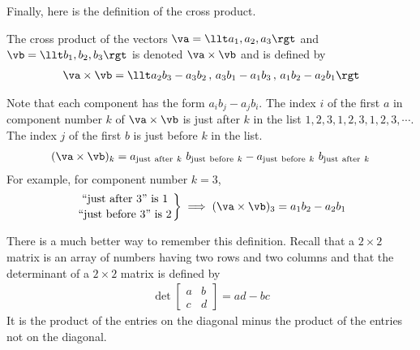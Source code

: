 \noindent
Finally, here is the definition of the cross product.

\begin{defn}\label{def:crossProd}
The cross product of the vectors $\va=\llt a_1,a_2,a_3\rgt$ and 
$\vb=\llt b_1,b_2,b_3\rgt$ is denoted $\va\times\vb$ 
and is defined by
\begin{align*}
\va\times\vb = \llt a_2b_3-a_3b_2\,,\, a_3b_1-a_1b_3\,,\, a_1b_2-a_2b_1\rgt 
\end{align*}
\end{defn}

Note that each component has the form $a_ib_j-a_jb_i$. The index $i$ of
the first $a$ in component number $k$ of $\va\times\vb$
is just after $k$ in the list $1,2,3,1,2,3,1,2,3,\cdots$. 
The index $j$ of the first $b$ is just before $k$ in the list. 
\begin{align*}
(\va\times\vb)_k
=a_{{\rm just\  after\  }k}\ b_{{\rm just\  before\  }k}
-a_{{\rm just\  before\  }k}\ b_{{\rm just\  after\  }k}
\end{align*}
For example, for component number $k=3$,
\begin{align*}
\left.{\text{``just after 3'' is 1}}\atop{\text{``just before 3'' is 2}}\right\}
\implies (\va\times\vb)_3= a_1b_2-a_2b_1
\end{align*}


There is a much better way to remember this definition. Recall that
a $2\times 2$ matrix is an array of numbers having two rows and two columns
and that the determinant of a $2\times 2$ matrix is  defined by
\begin{align*}
\det \left[\begin{matrix}a& b\\ c&d\end{matrix}\right]=ad-bc
\end{align*}
It is the product of the entries on the diagonal minus the product
of the entries not on the diagonal. 

